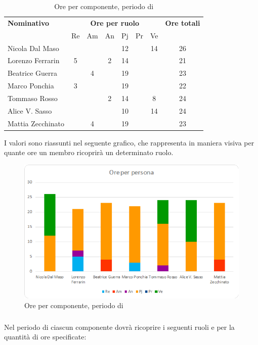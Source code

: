 \begin{table}[H]
	\centering
	\begin{tabular}{|l|c|c|c|c|c|c|c|}
		\hline
		\textbf{Nominativo} & 
		\multicolumn{6}{c|}{\textbf{Ore per ruolo}} & 
		\textbf{Ore totali} \\
		& Re & Am & An & Pj & Pr & Ve & \\
		\hline
		Nicola Dal Maso & & & &12 & &14 & 26 \\
		Lorenzo Ferrarin &5 & &2 &14 & & & 21 \\
		Beatrice Guerra & &4 & &19 & & & 23 \\
		Marco Ponchia &3 & & &19 & & & 22 \\
		Tommaso Rosso & & &2 &14 & &8 & 24 \\
		Alice V. Sasso & & & &10 & &14 & 24 \\
		Mattia Zecchinato & &4 & &19 & & & 23 \\
		\hline
	\end{tabular}
	\caption{Ore per componente, periodo di \PD{}}
\end{table}
I valori sono riassunti nel seguente grafico, che rappresenta in maniera visiva per quante ore un membro ricoprirà un determinato ruolo.
\begin{figure}[H]
	\centering
	\includegraphics[width=14cm]{img_suddlavoro/PD2.png}
	\caption{Ore per componente, periodo di \PD{}}
\end{figure}

\subsubsection{\Cod}
Nel periodo di \Cod{} ciascun componente dovrà ricoprire i seguenti ruoli e per la quantità di ore specificate:


